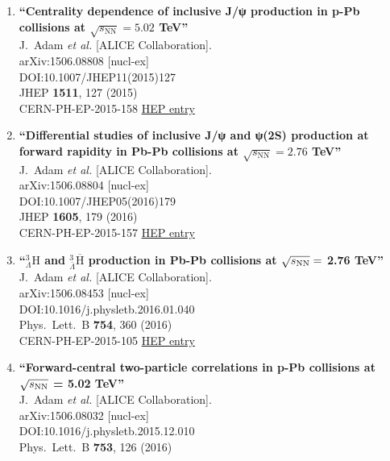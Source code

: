 \begin{enumerate}
\item%
{\bf ``Centrality dependence of inclusive J/ψ production in p-Pb collisions at $ \sqrt{s_{\mathrm{NN}}}=5.02 $ TeV''}
  \\{}J.~Adam {\it et al.} [ALICE Collaboration].
  \\{}arXiv:1506.08808 [nucl-ex]
  \\{}DOI:10.1007/JHEP11(2015)127
  \\{}JHEP {\bf 1511}, 127 (2015)
  \\{}CERN-PH-EP-2015-158
\href{http://inspirehep.net/record/1380193}{HEP entry}
\item%
{\bf ``Differential studies of inclusive J/ψ and ψ(2S) production at forward rapidity in Pb-Pb collisions at $ \sqrt{s_{\mathrm{NN}}}=2.76 $ TeV''}
  \\{}J.~Adam {\it et al.} [ALICE Collaboration].
  \\{}arXiv:1506.08804 [nucl-ex]
  \\{}DOI:10.1007/JHEP05(2016)179
  \\{}JHEP {\bf 1605}, 179 (2016)
  \\{}CERN-PH-EP-2015-157
\href{http://inspirehep.net/record/1380192}{HEP entry}
\item%
{\bf ``$^{3}_{\Lambda}\mathrm H$ and $^{3}_{\bar{\Lambda}} \overline{\mathrm H}$ production in Pb-Pb collisions at $\sqrt{s_{\rm NN}} =$ 2.76 TeV''}
  \\{}J.~Adam {\it et al.} [ALICE Collaboration].
  \\{}arXiv:1506.08453 [nucl-ex]
  \\{}DOI:10.1016/j.physletb.2016.01.040
  \\{}Phys.\ Lett.\ B {\bf 754}, 360 (2016)
  \\{}CERN-PH-EP-2015-105
\href{http://inspirehep.net/record/1380234}{HEP entry}
\item%
{\bf ``Forward-central two-particle correlations in p-Pb collisions at $\sqrt{s_{\rm NN}}$ = 5.02 TeV''}
  \\{}J.~Adam {\it et al.} [ALICE Collaboration].
  \\{}arXiv:1506.08032 [nucl-ex]
  \\{}DOI:10.1016/j.physletb.2015.12.010
  \\{}Phys.\ Lett.\ B {\bf 753}, 126 (2016)

\end{enumerate}
